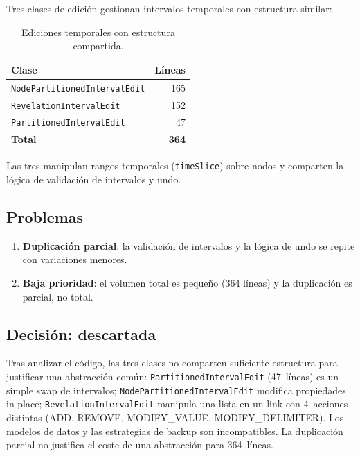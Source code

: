 \documentclass[12pt,a4paper]{article}
\newcommand{\code}[1]{\texttt{#1}}
\newcommand{\clase}[1]{\texttt{#1}}
\newcommand{\warn}[1]{\textcolor{warnorange}{\textbf{#1}}}
\begin{document}
Tres clases de edición gestionan intervalos temporales con estructura
similar:

\begin{table}[H]
\centering
\small
\begin{tabular}{lr}
\toprule
\textbf{Clase} & \textbf{Líneas} \\
\midrule
\clase{NodePartitionedIntervalEdit}   & 165 \\
\clase{RevelationIntervalEdit}        & 152 \\
\clase{PartitionedIntervalEdit}       & 47  \\
\midrule
\textbf{Total}                        & \textbf{364} \\
\bottomrule
\end{tabular}
\caption{Ediciones temporales con estructura compartida.}
\label{tab:r8-temporal}
\end{table}

Las tres manipulan rangos temporales (\code{timeSlice}) sobre nodos
y comparten la lógica de validación de intervalos y undo.

\subsection{Problemas}

\begin{enumerate}
  \item \warn{Duplicación parcial}: la validación de intervalos y la
        lógica de undo se repite con variaciones menores.
  \item \warn{Baja prioridad}: el volumen total es pequeño (364 líneas)
        y la duplicación es parcial, no total.
\end{enumerate}

\subsection{Decisión: descartada}

Tras analizar el código, las tres clases no comparten suficiente
estructura para justificar una abstracción común:
\clase{PartitionedIntervalEdit} (47~líneas) es un simple swap de
intervalos; \clase{NodePartitionedIntervalEdit} modifica propiedades
in-place; \clase{RevelationIntervalEdit} manipula una lista en un
link con 4~acciones distintas (ADD, REMOVE, MODIFY\_VALUE,
MODIFY\_DELIMITER). Los modelos de datos y las estrategias de backup
son incompatibles. La duplicación parcial no justifica el coste de
una abstracción para 364~líneas.
\end{document}
